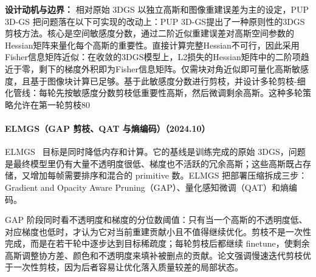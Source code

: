 \textbf{设计动机与边界：} 相对原始 3DGS 以独立高斯和图像重建误差为主的设定，PUP 3D-GS 把问题落在以下可实现的改动上：PUP 3D-GS提出了一种原则性的3DGS剪枝方法。核心是空间敏感度分数，通过二阶近似重建误差对高斯空间参数的Hessian矩阵来量化每个高斯的重要性。直接计算完整Hessian不可行，因此采用Fisher信息矩阵近似：在收敛的3DGS模型上，L2损失的Hessian矩阵中的二阶项趋近于零，剩下的梯度外积即为Fisher信息矩阵。仅需块对角近似即可量化高斯敏感度，且基于图像块计算已足够。基于此敏感度分数进行剪枝，并设计多轮剪枝-细化管线：每轮先按敏感度分数剪枝低重要性高斯，然后微调剩余高斯。这种多轮策略允许在第一轮剪枝80%
\paragraph{ELMGS（GAP 剪枝、QAT 与熵编码）（2024.10）}
ELMGS~\cite{2410_23213} 目标是同时降低内存和计算。它的基线是训练完成的原始 3DGS，问题是最终模型里仍有大量不透明度很低、梯度也不活跃的冗余高斯；这些高斯既占存储，又增加每帧需要排序和混合的 primitive 数。ELMGS 把部署压缩拆成三步：Gradient and Opacity Aware Pruning（GAP）、量化感知微调（QAT）和熵编码。

GAP 阶段同时看不透明度和梯度的分位数阈值：只有当一个高斯的不透明度低、对应梯度也低时，才认为它对当前重建贡献小且不值得继续优化。剪枝不是一次性完成，而是在若干轮中逐步达到目标稀疏度；每轮剪枝后都继续 finetune，使剩余高斯调整协方差、颜色和不透明度来填补被删点的贡献。论文强调慢速迭代剪枝优于一次性剪枝，因为后者容易让优化落入质量较差的局部状态。

